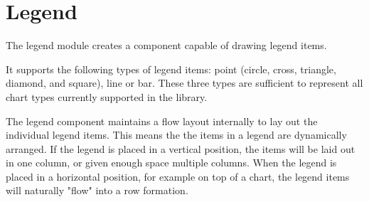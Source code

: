 \section{Legend}
The legend module creates a component capable of drawing legend items.

It supports the following types of legend items: point (circle, cross, triangle, diamond, and square), line or bar. These three types are sufficient to represent all chart types currently supported in the library.

The legend component maintains a flow layout internally to lay out the individual legend items. This means the the items in a legend are dynamically arranged. If the legend is placed in a vertical position, the items will be laid out in one column, or given enough space multiple columns. When the legend is placed in a horizontal position, for example on top of a chart, the legend items will naturally "flow" into a row formation.
